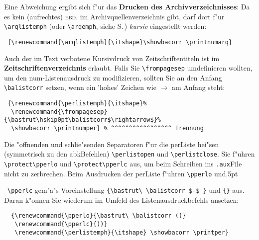 \documentclass[12pt,a4paper]{article}
\newcommand{\pdfko}[1]{\kern #1pt
                          \strut\ignorespaces}%
\begin{document}
Eine Abweichung ergibt sich f"ur das \textbf{Drucken des Archivverzeichnisses}: Da 
es kein (aufrechtes) \textsc{ebd.} im Archivquellenverzeichnis gibt, darf dort 
f"ur \verb|\arqlistemph| (oder \verb|\arqemph|, siehe S.\,\pageref{arqemph2}) 
\textit{kursiv} eingestellt werden:

\vspace{-.25ex}
{\footnotesize\begin{verbatim}
 {\renewcommand{\arqlistemph}{\itshape}\showbacorr \printnumarq}
\end{verbatim}}\label{arqemph1}

\vspace{-2.5ex}
 {\renewcommand{\arqlistemph}{\itshape}\showbacorr \printnumarq}


\vspace{2.5ex}\noindent
Auch der im Text verbotene Kursivdruck von Zeitschriftentiteln ist 
im \textbf{Zeitschriftenverzeichnis} erlaubt. Falls Sie 
\verb|\frompagesep| umdefinieren wollten, um den
num-Listenausdruck zu modifizieren,
sollten Sie an den Anfang \verb|\balistcorr| 
setzen, wenn ein 'hohes' Zeichen wie $\rightarrow$ am Anfang steht:

\vspace{-.5ex}
{\footnotesize\begin{verbatim}
 {\renewcommand{\perlistemph}{\itshape}%
  \renewcommand{\frompagesep}{\bastrut\hskip0pt\balistcorr$\rightarrow$}%
  \showbacorr \printnumper} % ^^^^^^^^^^^^^^^^^ Trennung
\end{verbatim}}

\vspace{-2.5ex}
 {\renewcommand{\perlistemph}{\itshape}%
  \renewcommand{\frompagesep}{\bastrut\hskip0pt\balistcorr$\rightarrow$}%
  \showbacorr \printnumper} %

\vspace{1ex}\noindent
Die "offnenden und schlie"senden Separatoren f"ur die per\hy Liste
hei"sen (symmetrisch zu den abk\hy Befehlen) \label{perlistopen}
\verb|\perlistopen| und \verb|\perlistclose|. Sie f"uhren
\verb|\protect\pperlo| und \verb|\protect\pperlc| aus, um
beim Schreiben ins \verb|.aux|\hy File nicht zu zerbrechen.
Beim Ausdrucken der per\hy Liste f"uhren \verb|\pperlo| und\pdfko{.5}\ 
\verb|\pperlc| gem"a"s Voreinstellung 
\verb|{\bastrut\ \balistcorr $-$ }| und \verb|{}| aus. Daran k"onnen
Sie wiederum im Umfeld des Listenausdruckbefehls ansetzen:

\vspace{-.75ex}
{\small\begin{verbatim}
  {\renewcommand{\pperlo}{\bastrut\ \balistcorr ((}
   \renewcommand{\pperlc}{))}
   \renewcommand{\perlistemph}{\itshape} \showbacorr \printper}
\end{verbatim}}
\end{document}
